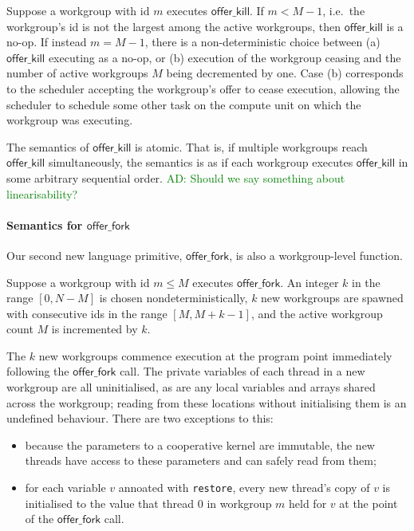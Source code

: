 \documentclass[nocopyrightspace]{sigplanconf-pldi16}
\newcommand{\ADComment}[1]{\textcolor{green}{AD: #1}}
\newcommand{\offerfork}{\mathsf{offer\_fork}}
\newcommand{\offerkill}{\mathsf{offer\_kill}}
\begin{document}
Suppose a workgroup with id $m$ executes $\offerkill$.  If $m < M-1$,
i.e.\ the workgroup's id is not the largest among the active
workgroups, then $\offerkill$ is a no-op.  If instead $m = M-1$, there
is a non-deterministic choice between (a) $\offerkill$ executing as a
no-op, or (b) execution of the workgroup ceasing and the number of
active workgroups $M$ being decremented by one.  Case (b) corresponds
to the scheduler accepting the workgroup's offer to cease execution,
allowing the scheduler to schedule some other task on the compute unit
on which the workgroup was executing.

The semantics of $\offerkill$ is atomic.  That is, if multiple
workgroups reach $\offerkill$ simultaneously, the semantics is as if
each workgroup executes $\offerkill$ in some arbitrary sequential
order.  \ADComment{Should we say something about linearisability?}

\paragraph{Semantics for $\offerfork$}

Our second new language primitive, $\offerfork$, is also a workgroup-level
function.

Suppose a workgroup with id $m\leq M$ executes $\offerfork$.  An
integer $k$ in the range $[0, N-M]$ is chosen nondeterministically,
$k$ new workgroups are spawned with consecutive ids in the range
$[M, M+k-1]$, and the active workgroup count $M$ is incremented by
$k$.

The $k$ new workgroups commence execution at the program point
immediately following the $\offerfork$ call.  The private variables of
each thread in a new workgroup are all uninitialised, as are any local
variables and arrays shared across the workgroup; reading from these
locations without initialising them is an undefined behaviour.  There
are two exceptions to this:

\begin{itemize}

\item because the parameters to a cooperative kernel are immutable,
  the new threads have access to these parameters and can safely read
  from them;

\item for each variable $v$ annoated with \texttt{restore}, every new
  thread's copy of $v$ is initialised to the value that thread 0 in
  workgroup $m$ held for $v$ at the point of the $\offerfork$ call.

\end{itemize}
\end{document}

